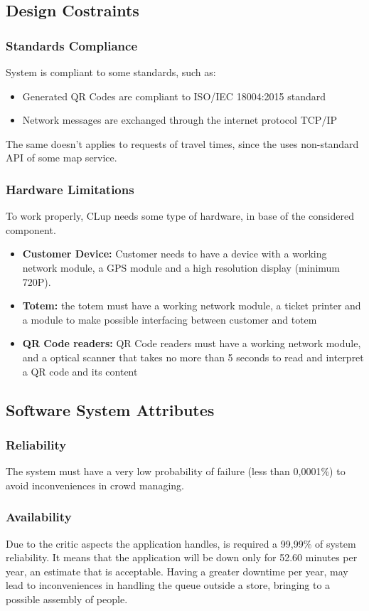 \documentclass{article}
\begin{document}
	\subsection{Design Costraints}
		\subsubsection{Standards Compliance}
	System is compliant to some standards, such as:
	\begin{itemize}
		\item Generated QR Codes are compliant to ISO/IEC 18004:2015 standard
		\item Network messages are exchanged through the internet protocol TCP/IP
	\end{itemize}
The same doesn't applies to requests of travel times, since the uses non-standard API of some map service.
		\subsubsection{Hardware Limitations}
		To work properly, CLup needs some type of hardware, in base of the considered component.
		\begin{itemize}
			\item {\bfseries Customer Device:} Customer needs to have a device with a working network module, a GPS module and a high resolution display (minimum 720P).
			\item {\bfseries Totem:} the totem must have a working network module, a ticket printer and a module to make possible interfacing between customer and totem
			\item {\bfseries QR Code readers:} QR Code readers must have a working network module, and a optical scanner that takes no more than 5 seconds to read and interpret a QR code and its content
		\end{itemize}
	\subsection{Software System Attributes}
		\subsubsection{Reliability}
		The system must have a  very low probability of failure (less than 0,0001\%) to avoid inconveniences in crowd managing.
		\subsubsection{Availability}
		Due to the critic aspects the application handles, is required a 99,99\% of system reliability. It means that the application will be down only for 52.60 minutes per year, an estimate that is acceptable. Having a greater downtime per year, may lead to inconveniences in handling the queue outside a store, bringing to a possible assembly of people.
\end{document}

